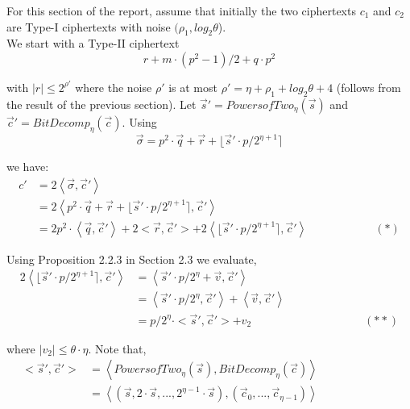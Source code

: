 \documentclass[../../main.tex]{subfiles}
\begin{document}
\noindent For this section of the report, assume that initially the two ciphertexts $c_1$ and $c_2$ are Type-I ciphertexts with noise $(\rho_1, log_2\theta$).\\

\noindent We start with a Type-II ciphertext
\begin{equation*}
    r + m\cdot (p^2-1)/2 + q \cdot p^2
\end{equation*}

\noindent with $|r| \leq 2^{\rho'}$ where the noise $\rho'$ is at most $\rho' = \eta + \rho_1 + log_2\theta + 4$ (follows from the result of the previous section). Let $\vec s'= PowersofTwo_\eta(\vec s)$ and $\vec c' = BitDecomp_\eta(\vec c)$. Using
\begin{equation*}
    \vec \sigma = p^2\cdot \vec q + \vec r + \lfloor \vec s' \cdot p/{2^{\eta + 1}} \rceil
\end{equation*} 

\noindent we have:
\begin{equation*}
    \begin{split}
        c' &= 2\left<\vec \sigma, \vec c'\right>\\
           &= 2\left<p^2\cdot \vec q + \vec r + \lfloor \vec s' \cdot p/2^{\eta + 1} \rceil, \vec c' \right>\\
           &= 2p^2 \cdot \left<\vec q, \vec c'\right> + 2 <\vec r, \vec c'> + 2\left<\lfloor\vec s' \cdot p/2^{\eta + 1}\rceil, \vec c' \right> \qquad \qquad \qquad (*)
    \end{split}
\end{equation*}

\noindent Using Proposition 2.2.3 in Section 2.3 we evaluate,
\begin{equation*}
    \begin{split}
       2\left<\lfloor \vec s' \cdot p/2^{\eta + 1}\rceil, \vec c' \right> &= \left<\vec s' \cdot p/2^\eta + \vec v, \vec c' \right> \qquad \qquad \qquad \qquad \qquad \qquad \\
       &= \left<\vec s' \cdot p/2^\eta, \vec c' \right> + \left<\vec v,\vec c'\right>\\
       &= p/2^\eta \cdot <\vec s', \vec c'> + v_2 \qquad \qquad \qquad \qquad \qquad (**)
    \end{split}
\end{equation*}

\noindent where $|v_2| \leq \theta \cdot \eta$. Note that, 
\begin{equation*}
    \begin{split}
        <\vec s', \vec c'> &= \left<PowersofTwo_\eta(\vec s), BitDecomp_\eta(\vec c)\right>  \qquad \qquad \qquad \quad\\
        &= \left<\left(\vec s, 2\cdot \vec s, ..., 2^{\eta-1}\cdot \vec s\right), \left(\vec c_0, ..., \vec c_{\eta-1}\right)\right>
    \end{split}
\end{equation*}
\end{document}
